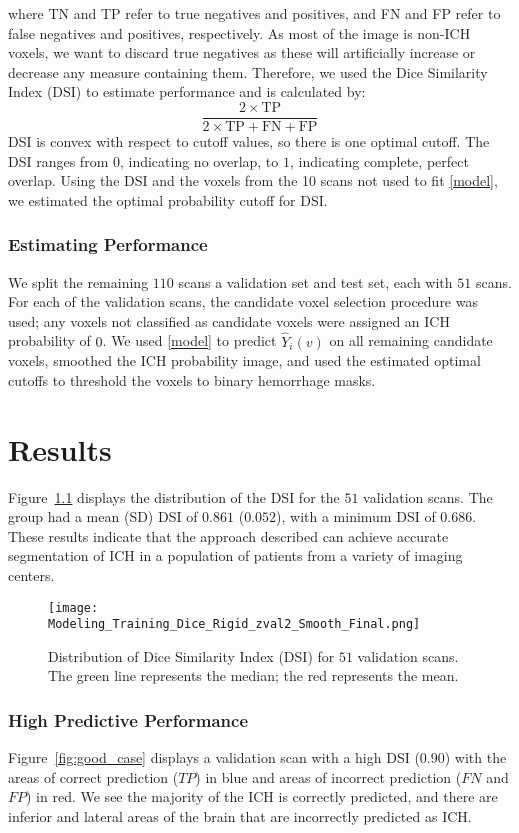\documentclass[12pt]{report}
\begin{document}
\begin{refsection}
where TN and TP refer to true negatives and positives, and FN and FP refer to false negatives and positives, respectively.  As most of the image is non-ICH voxels, we want to discard true negatives as these will artificially increase or decrease any measure containing them.  Therefore, we used the Dice Similarity Index (DSI) \citep{dice_measures_1945} to estimate performance and is calculated by:
$$
\frac{2 \times \text{TP} }{ 2\times \text{TP} + \text{FN} + \text{FP}} 
$$
DSI is convex with respect to cutoff values, so there is one optimal cutoff.  The DSI ranges from $0$, indicating no overlap, to $1$, indicating complete, perfect overlap.  Using the DSI and the voxels from the 10 scans not used to fit \eqref{model}, we estimated the optimal probability cutoff for DSI.


\subsection{Estimating Performance}
We split the remaining $110$ scans a validation set and test set, each with $51$ scans.  For each of the validation scans, the candidate voxel selection procedure was used; any voxels not classified as candidate voxels were assigned an ICH probability of $0$.  We used \eqref{model} to predict $\hat{Y}_{i}(v)$ on all remaining candidate voxels, smoothed the ICH probability image, and used the estimated optimal cutoffs to threshold the voxels to binary hemorrhage masks.

\chapter{Results}
Figure~\ref{fig:hist} displays the distribution of the DSI for the $51$ validation scans.  The group had a mean (SD) DSI of $0.861$ ($0.052$), with a minimum DSI of $0.686$.  These results indicate that the approach described can achieve accurate segmentation of ICH in a population of patients from a variety of imaging centers.  
  
\begin{figure}[htbp]
\centering
    \texttt{[image: Modeling\_Training\_Dice\_Rigid\_zval2\_Smooth\_Final.png]}
\caption{Distribution of Dice Similarity Index (DSI) for $51$ validation scans. The green line represents the median; the red represents the mean.}
\label{fig:hist}
\end{figure}    

\subsection{High Predictive Performance}
Figure~\ref{fig:good_case} displays a validation scan with a high DSI ($0.90$) with the areas of correct prediction ($TP$) in blue and areas of incorrect prediction ($FN$ and $FP$) in red.  We see the majority of the ICH is correctly predicted, and there are inferior and lateral areas of the brain that are incorrectly predicted as ICH.  


\end{refsection}
\end{document}
